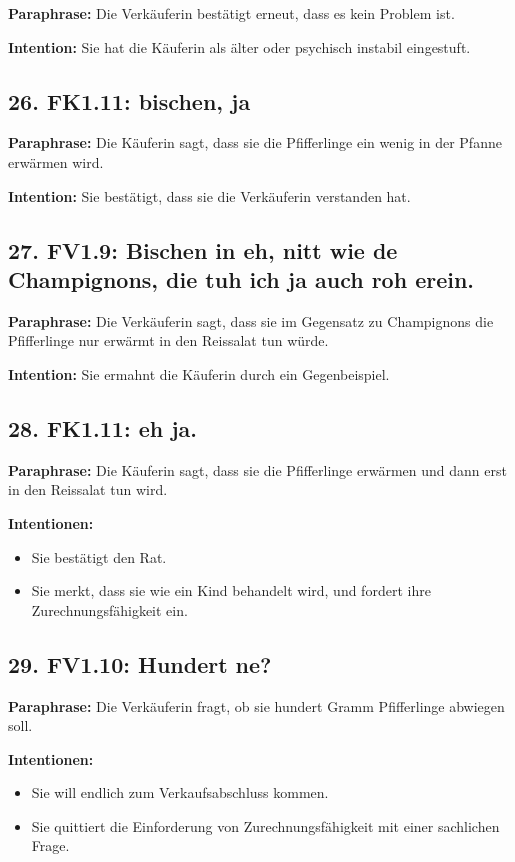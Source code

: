 \documentclass[11pt]{article}
\begin{document}
\textbf{Paraphrase:} Die Verkäuferin bestätigt erneut, dass es kein Problem ist.

\textbf{Intention:} Sie hat die Käuferin als älter oder psychisch instabil eingestuft.

\subsection*{26. FK1.11: bischen, ja}

\textbf{Paraphrase:} Die Käuferin sagt, dass sie die Pfifferlinge ein wenig in der Pfanne erwärmen wird.

\textbf{Intention:} Sie bestätigt, dass sie die Verkäuferin verstanden hat.

\subsection*{27. FV1.9: Bischen in eh, nitt wie de Champignons, die tuh ich ja auch roh erein.}

\textbf{Paraphrase:} Die Verkäuferin sagt, dass sie im Gegensatz zu Champignons die Pfifferlinge nur erwärmt in den Reissalat tun würde.

\textbf{Intention:} Sie ermahnt die Käuferin durch ein Gegenbeispiel.

\subsection*{28. FK1.11: eh ja.}

\textbf{Paraphrase:} Die Käuferin sagt, dass sie die Pfifferlinge erwärmen und dann erst in den Reissalat tun wird.

\textbf{Intentionen:}
\begin{itemize}
    \item Sie bestätigt den Rat.
    \item Sie merkt, dass sie wie ein Kind behandelt wird, und fordert ihre Zurechnungsfähigkeit ein.
\end{itemize}

\subsection*{29. FV1.10: Hundert ne?}

\textbf{Paraphrase:} Die Verkäuferin fragt, ob sie hundert Gramm Pfifferlinge abwiegen soll.

\textbf{Intentionen:}
\begin{itemize}
    \item Sie will endlich zum Verkaufsabschluss kommen.
    \item Sie quittiert die Einforderung von Zurechnungsfähigkeit mit einer sachlichen Frage.
\end{itemize}
\end{document}
